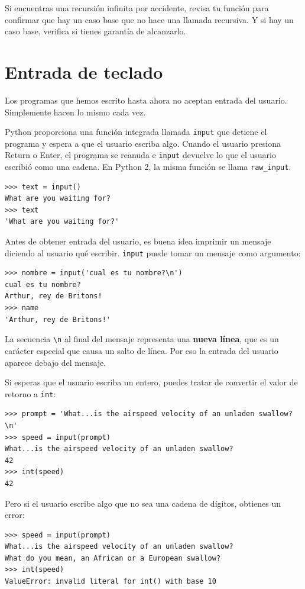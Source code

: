 Si encuentras una recursión infinita por accidente, revisa tu función para confirmar que hay un caso base que no hace una llamada recursiva. Y si hay un caso base, verifica si tienes garantía de alcanzarlo.

\section{Entrada de teclado}

Los programas que hemos escrito hasta ahora no aceptan entrada del usuario. Simplemente hacen lo mismo cada vez.

Python proporciona una función integrada llamada \texttt{input} que detiene el programa y espera a que el usuario escriba algo. Cuando el usuario presiona Return o Enter, el programa se reanuda e \texttt{input} devuelve lo que el usuario escribió como una cadena. En Python 2, la misma función se llama \texttt{raw\_input}.

\begin{lstlisting}
>>> text = input()
What are you waiting for?
>>> text
'What are you waiting for?'
\end{lstlisting}

Antes de obtener entrada del usuario, es buena idea imprimir un mensaje diciendo al usuario qué escribir. \texttt{input} puede tomar un mensaje como argumento:

\begin{lstlisting}
>>> nombre = input('cual es tu nombre?\n')
cual es tu nombre?
Arthur, rey de Britons!
>>> name
'Arthur, rey de Britons!'
\end{lstlisting}

La secuencia \texttt{\textbackslash n} al final del mensaje representa una \textbf{nueva línea}, que es un carácter especial que causa un salto de línea. Por eso la entrada del usuario aparece debajo del mensaje.

Si esperas que el usuario escriba un entero, puedes tratar de convertir el valor de retorno a \texttt{int}:

\begin{lstlisting}
>>> prompt = 'What...is the airspeed velocity of an unladen swallow?\n'
>>> speed = input(prompt)
What...is the airspeed velocity of an unladen swallow?
42
>>> int(speed)
42
\end{lstlisting}

Pero si el usuario escribe algo que no sea una cadena de dígitos, obtienes un error:

\begin{lstlisting}
>>> speed = input(prompt)
What...is the airspeed velocity of an unladen swallow?
What do you mean, an African or a European swallow?
>>> int(speed)
ValueError: invalid literal for int() with base 10
\end{lstlisting}

